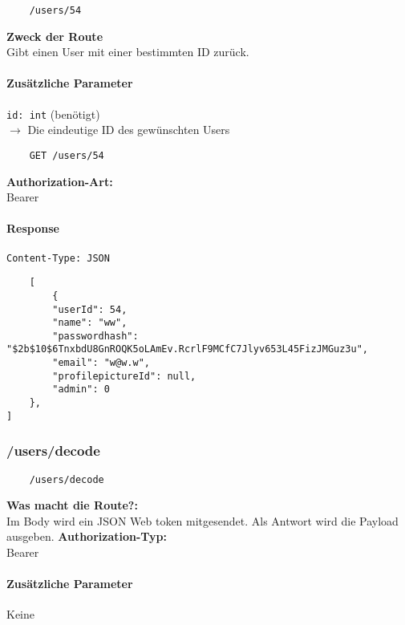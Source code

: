 \begin{lstlisting}
    /users/54
\end{lstlisting}

\textbf{Zweck der Route} \\
Gibt einen User mit einer bestimmten ID zurück.



\paragraph{Zusätzliche Parameter}
\lstinline{id: int} (benötigt) \\
$\rightarrow$ Die eindeutige ID des gewünschten Users

\begin{lstlisting}
    GET /users/54
\end{lstlisting}


\textbf{Authorization-Art:} \\
Bearer

\paragraph{Response }

\lstinline{Content-Type: JSON}
\begin{lstlisting}
    [
        {
        "userId": 54,
        "name": "ww",
        "passwordhash": "$2b$10$6TnxbdU8GnROQK5oLAmEv.RcrlF9MCfC7Jlyv653L45FizJMGuz3u",
        "email": "w@w.w",
        "profilepictureId": null,
        "admin": 0
    },
]
\end{lstlisting}

\pagebreak

\subsubsection{/users/decode}

\begin{lstlisting}
    /users/decode
\end{lstlisting}

\textbf{Was macht die Route?:} \\
Im Body wird ein JSON Web token mitgesendet. Als Antwort
wird die Payload ausgeben.
\textbf{Authorization-Typ:} \\
Bearer


\paragraph{Zusätzliche Parameter}
Keine

